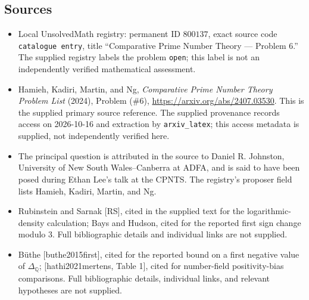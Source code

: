 \documentclass[11pt]{article}
\newcommand{\Q}{\mathbb{Q}}
\begin{document}
\subsection{Sources}
\begin{itemize}
\item Local UnsolvedMath registry: permanent ID \(800137\), exact source code \texttt{catalogue entry}, title ``Comparative Prime Number Theory --- Problem 6.'' The supplied registry labels the problem \texttt{open}; this label is not an independently verified mathematical assessment.
\item Hamieh, Kadiri, Martin, and Ng, \emph{Comparative Prime Number Theory Problem List} (2024), Problem (\#6), \url{https://arxiv.org/abs/2407.03530}. This is the supplied primary source reference. The supplied provenance records access on 2026-10-16 and extraction by \texttt{arxiv\_latex}; this access metadata is supplied, not independently verified here.
\item The principal question is attributed in the source to Daniel R. Johnston, University of New South Wales--Canberra at ADFA, and is said to have been posed during Ethan Lee's talk at the CPNTS. The registry's proposer field lists Hamieh, Kadiri, Martin, and Ng.
\item Rubinstein and Sarnak [RS], cited in the supplied text for the logarithmic-density calculation; Bays and Hudson, cited for the reported first sign change modulo \(3\). Full bibliographic details and individual links are not supplied.
\item B\"uthe [buthe2015first], cited for the reported bound on a first negative value of \(\Delta_{\Q}\); [hathi2021mertens, Table 1], cited for number-field positivity-bias comparisons. Full bibliographic details, individual links, and relevant hypotheses are not supplied.
\end{itemize}
\end{document}
